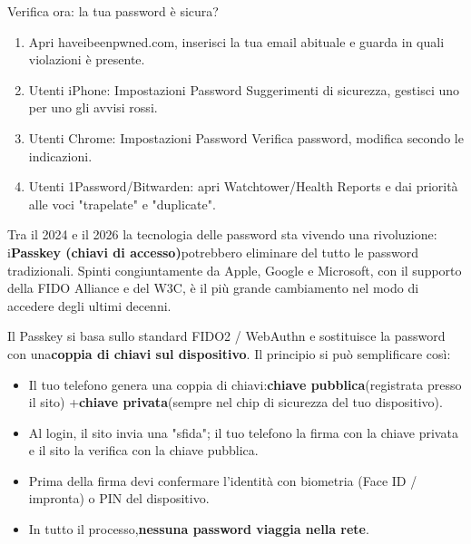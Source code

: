 \begin{tcbpractice}{Verifica ora: la tua password è sicura?}
\begin{enumerate}
  \item Apri haveibeenpwned.com, inserisci la tua email abituale e guarda in quali violazioni è presente.
  \item Utenti iPhone: Impostazioni Password Suggerimenti di sicurezza, gestisci uno per uno gli avvisi rossi.
  \item Utenti Chrome: Impostazioni Password Verifica password, modifica secondo le indicazioni.
  \item Utenti 1Password/Bitwarden: apri Watchtower/Health Reports e dai priorità alle voci "trapelate" e "duplicate".
\end{enumerate}

\end{tcbpractice}


Tra il 2024 e il 2026 la tecnologia delle password sta vivendo una rivoluzione: i\textbf{Passkey (chiavi di accesso)}potrebbero eliminare del tutto le password tradizionali. Spinti congiuntamente da Apple, Google e Microsoft, con il supporto della FIDO Alliance e del W3C, è il più grande cambiamento nel modo di accedere degli ultimi decenni.


Il Passkey si basa sullo standard FIDO2 / WebAuthn e sostituisce la password con una\textbf{coppia di chiavi sul dispositivo}. Il principio si può semplificare così:

\begin{itemize}
  \item Il tuo telefono genera una coppia di chiavi:\textbf{chiave pubblica}(registrata presso il sito) +\textbf{chiave privata}(sempre nel chip di sicurezza del tuo dispositivo).
  \item Al login, il sito invia una "sfida"; il tuo telefono la firma con la chiave privata e il sito la verifica con la chiave pubblica.
  \item Prima della firma devi confermare l'identità con biometria (Face ID / impronta) o PIN del dispositivo.
  \item In tutto il processo,\textbf{nessuna password viaggia nella rete}.
\end{itemize}


